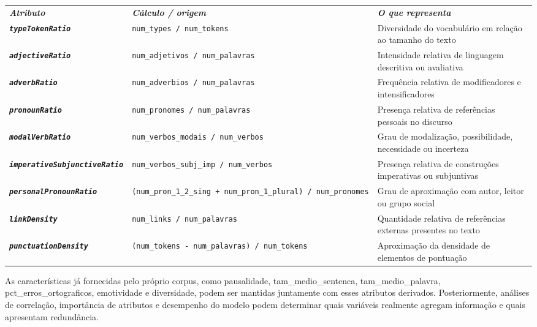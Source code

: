 \documentclass[
  brazilian,
  11pt,
]{article}
\newcounter{none} %
\begin{document}
{\def\LTcaptype{none} %
\begin{longtable}[]{@{}
  >{\raggedright\arraybackslash}p{}
  >{\raggedright\arraybackslash}p{}
  >{\raggedright\arraybackslash}p{}@{}}
\toprule\noalign{}
\endhead
\bottomrule\noalign{}
\endlastfoot
\textbf{\emph{Atributo}} & \textbf{\emph{Cálculo / origem}} & \textbf{\emph{O que representa}} \\
\textbf{\emph{\texttt{typeTokenRatio}}} & \texttt{num\_types\ /\ num\_tokens} & Diversidade do vocabulário em relação ao tamanho do texto \\
\textbf{\emph{\texttt{adjectiveRatio}}} & \texttt{num\_adjetivos\ /\ num\_palavras} & Intensidade relativa de linguagem descritiva ou avaliativa \\
\textbf{\emph{\texttt{adverbRatio}}} & \texttt{num\_adverbios\ /\ num\_palavras} & Frequência relativa de modificadores e intensificadores \\
\textbf{\emph{\texttt{pronounRatio}}} & \texttt{num\_pronomes\ /\ num\_palavras} & Presença relativa de referências pessoais no discurso \\
\textbf{\emph{\texttt{modalVerbRatio}}} & \texttt{num\_verbos\_modais\ /\ num\_verbos} & Grau de modalização, possibilidade, necessidade ou incerteza \\
\textbf{\emph{\texttt{imperativeSubjunctiveRatio}}} & \texttt{num\_verbos\_subj\_imp\ /\ num\_verbos} & Presença relativa de construções imperativas ou subjuntivas \\
\textbf{\emph{\texttt{personalPronounRatio}}} & \texttt{(num\_pron\_1\_2\_sing\ +\ num\_pron\_1\_plural)\ /\ num\_pronomes} & Grau de aproximação com autor, leitor ou grupo social \\
\textbf{\emph{\texttt{linkDensity}}} & \texttt{num\_links\ /\ num\_palavras} & Quantidade relativa de referências externas presentes no texto \\
\textbf{\emph{\texttt{punctuationDensity}}} & \texttt{(num\_tokens\ -\ num\_palavras)\ /\ num\_tokens} & Aproximação da densidade de elementos de pontuação \\
\end{longtable}
}

As características já fornecidas pelo próprio corpus, como pausalidade, tam\_medio\_sentenca, tam\_medio\_palavra, pct\_erros\_ortograficos, emotividade e diversidade, podem ser mantidas juntamente com esses atributos derivados. Posteriormente, análises de correlação, importância de atributos e desempenho do modelo podem determinar quais variáveis realmente agregam informação e quais apresentam redundância.
\end{document}
